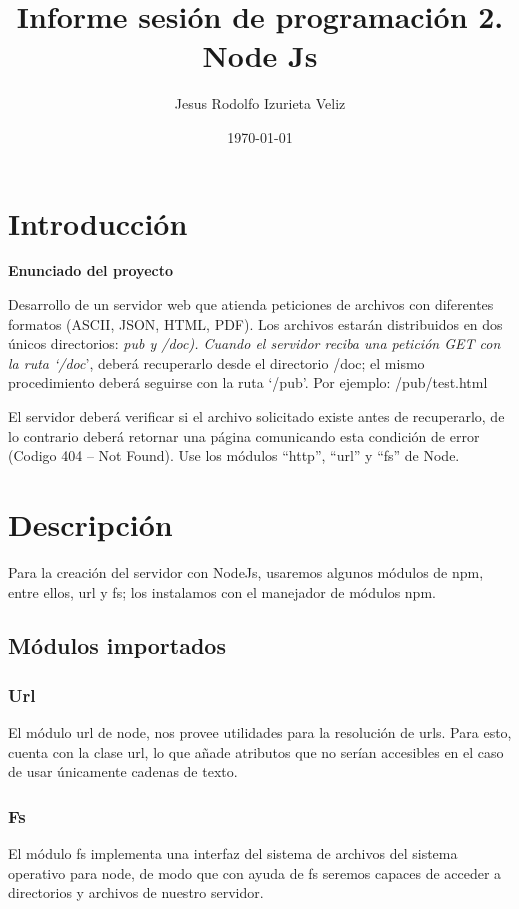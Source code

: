 \documentclass[11pt]{article}
\author{Jesus Rodolfo Izurieta Veliz}
\date{\today}
\title{Informe sesión de programación 2. Node Js}
\begin{document}
\maketitle
\tableofcontents

\pagebreak
\section{Introducción}
\label{sec:orgf6cc251}
\textbf{Enunciado del proyecto}

Desarrollo de un servidor web que atienda peticiones de archivos con diferentes formatos (ASCII, JSON, HTML, PDF).
Los archivos estarán distribuidos en dos únicos directorios: \emph{pub y /doc).
Cuando el servidor reciba una petición GET con la ruta ‘/doc}', deberá recuperarlo desde el directorio /doc;
el mismo procedimiento deberá seguirse con la ruta ‘/pub'. Por ejemplo: /pub/test.html

El servidor deberá verificar si el archivo solicitado existe antes de recuperarlo,
de lo contrario deberá retornar una página comunicando esta condición de error (Codigo 404 – Not Found).
Use los módulos “http”, “url” y “fs” de Node.

\section{Descripción}
\label{sec:orgdb98373}
Para la creación del servidor con NodeJs, usaremos algunos módulos de npm,
entre ellos, url y fs; los instalamos con el manejador de módulos npm.

\subsection{Módulos importados}
\label{sec:org4968f15}

\subsubsection{Url}
\label{sec:org828c130}
El módulo url de node, nos provee utilidades para la resolución de urls.
Para esto, cuenta con la clase url, lo que añade atributos que no serían accesibles en el caso de usar únicamente cadenas de texto.

\subsubsection{Fs}
\label{sec:orgabaaff6}
El módulo fs implementa una interfaz del sistema de archivos del sistema operativo para node,
de modo que con ayuda de fs seremos capaces de acceder a directorios y archivos de nuestro servidor.
\end{document}
